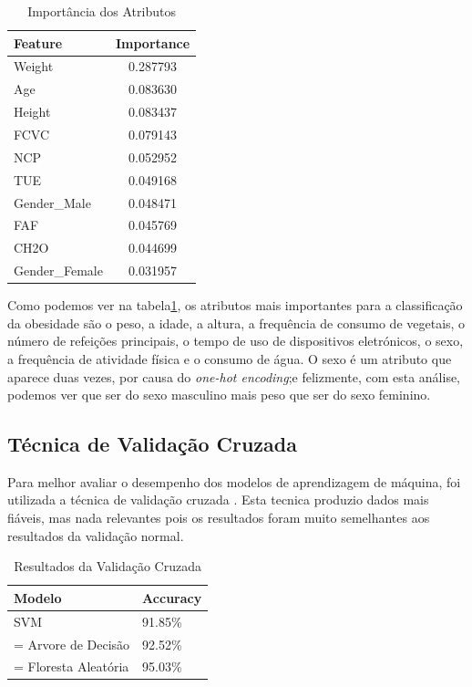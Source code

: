 \documentclass{easychair}
\begin{document}
\begin{table}[ht]
  \centering
  \begin{tabular}{l c}
  \toprule
  Feature                    & Importance   \\
  \midrule
  Weight                     & 0.287793     \\
  Age                        & 0.083630     \\
  Height                     & 0.083437     \\
  FCVC                       & 0.079143     \\
  NCP                        & 0.052952     \\
  TUE                        & 0.049168     \\
  Gender\_Male               & 0.048471     \\
  FAF                        & 0.045769     \\
  CH2O                       & 0.044699     \\
  Gender\_Female             & 0.031957     \\
  \bottomrule
  \end{tabular}
  \caption{Importância dos Atributos}
  \label{tab:importance}
\end{table}

Como podemos ver na tabela\ref{tab:importance}, os atributos mais importantes para a classificação da obesidade são o peso, a idade, a altura, a frequência de consumo de vegetais, o número de refeições principais, o tempo de uso de dispositivos eletrónicos, o sexo, a frequência de atividade física e o consumo de água. O sexo é um atributo que aparece duas vezes, por causa do \textit{one-hot encoding};e felizmente, com esta análise, podemos ver que ser do sexo masculino mais peso que ser do sexo feminino.

\subsection{Técnica de Validação Cruzada}

Para melhor avaliar o desempenho dos modelos de aprendizagem de máquina, foi utilizada a técnica de validação cruzada \cite{cross-validation}. Esta tecnica produzio dados mais fiáveis, mas nada relevantes pois os resultados foram muito semelhantes aos resultados da validação normal.

\begin{table}[ht]
  \centering
  \begin{tabular}{l l}
  \toprule
  Modelo & Accuracy \\
  \midrule
  SVM & 91.85\% \\=
  Arvore de Decisão & 92.52\% \\=
  Floresta Aleatória & 95.03\% \\
  \bottomrule
  \end{tabular}
  \caption{Resultados da Validação Cruzada}
  \label{tab:cross-validation}
\end{table}
\end{document}
